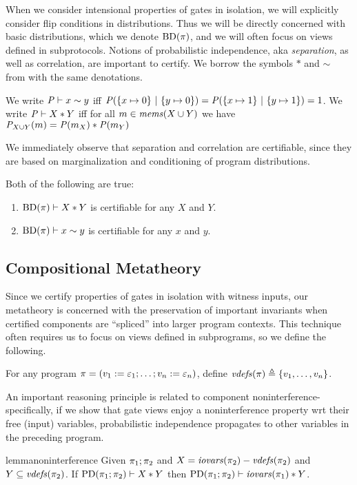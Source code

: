 When we consider intensional properties
of gates in isolation, we will explicitly consider flip conditions in
distributions. Thus we will be directly concerned with basic distributions,
which we denote $\mathrm{BD}(\pi)$, and we will often focus on views
defined in subprotocols. 
Notions of probabilistic independence, aka \emph{separation}, as well
as correlation, are important to certify. We borrow the symbols $*$
and $\sim$ from \cite{barthe2019probabilistic} with the same
denotations.
\begin{definition}
  We write $\mathit{P} \vdash x \sim y$ iff $\mathit{P}(\{ x \mapsto 0\}\ |\ \{ y \mapsto 0 \}) =
  \mathit{P}(\{ x \mapsto 1\}\ |\ \{ y \mapsto 1 \}) = 1$.
  We write $\mathit{P} \vdash X * Y$ iff for all
    $m \in \mathit{mems}(X \cup Y)$ we have
  ${\mathit{P}}_{X \cup Y}(m) =
  \mathit{P}(m_X) * \mathit{P}(m_Y)$
\end{definition}
We immediately observe that separation and correlation are certifiable,
since they are based on marginalization and conditioning of program
distributions. 
\begin{lemma}
  \label{lemma-autosep}
  Both of the following are true:
  \begin{enumerate}
  \item $\mathrm{BD}(\pi) \vdash X * Y$ is certifiable for any $X$ and $Y$.
  \item $\mathrm{BD}(\pi) \vdash x \sim y$ is certifiable for any $x$ and $y$.
  \end{enumerate}
\end{lemma}

\subsection{Compositional Metatheory}
\label{section-automation-logic}

Since we certify properties of gates in isolation with witness inputs,
our metatheory is concerned with the preservation of important invariants
when certified components are ``spliced'' into larger program
contexts. This technique often requires us to focus on views defined
in subprograms, so we define the following.
\begin{definition}
For any program $\pi =
  (v_1 := \varepsilon_1;\ldots;v_n := \varepsilon_n)$, define
$\mathit{vdefs}(\pi) \triangleq \{ v_1,\ldots,v_n \}$.
\end{definition}

An important reasoning principle is related to component
noninterference- specifically, if we show that gate views enjoy a
noninterference property wrt their free (input) variables,
probabilistic independence propagates to other variables in the
preceding program.
\begin{restatable}[Noninterference]{lemma}{noninterference}
  \label{lemma-noninterference}
  Given $\pi_1;\pi_2$ and $X = \mathit{iovars}(\pi_2) - \mathit{vdefs}(\pi_2)$ and
  $Y \subseteq \mathit{vdefs}(\pi_2)$. If $\mathrm{PD}(\pi_1;\pi_2) \vdash X * Y$
  then $\mathrm{PD}(\pi_1;\pi_2) \vdash \mathit{iovars}(\pi_1) * Y$.
\end{restatable}

